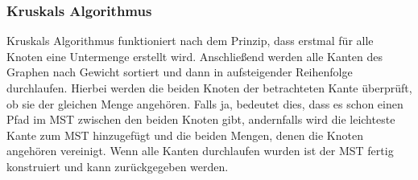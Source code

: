 \documentclass[
../AuD-Zusammenfassung.tex,
]
{subfiles}
\begin{document}
\subsubsection{Kruskals Algorithmus}
Kruskals Algorithmus funktioniert nach dem Prinzip, dass erstmal für alle Knoten eine Untermenge erstellt wird. Anschließend werden alle Kanten des Graphen nach Gewicht sortiert und dann in aufsteigender Reihenfolge durchlaufen. Hierbei werden die beiden Knoten der betrachteten Kante überprüft, ob sie der gleichen Menge angehören. Falls ja, bedeutet dies, dass es schon einen Pfad im MST zwischen den beiden Knoten gibt, andernfalls wird die leichteste Kante zum MST hinzugefügt und die beiden Mengen, denen die Knoten angehören vereinigt. Wenn alle Kanten durchlaufen wurden ist der MST fertig konstruiert und kann zurückgegeben werden.\\
\begin{algorithm}[H]
\end{algorithm}
\end{document}
